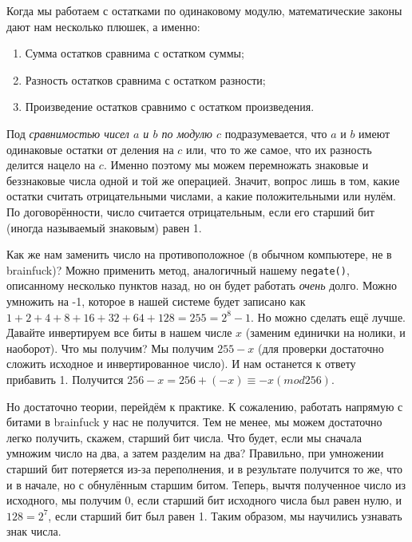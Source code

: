 \documentclass{book}
\begin{document}
Когда мы работаем с остатками по одинаковому модулю, математические законы дают нам несколько плюшек, а именно:

\begin{enumerate}
    \item Сумма остатков сравнима с остатком суммы;
    \item Разность остатков сравнима с остатком разности;
    \item Произведение остатков сравнимо с остатком произведения.
\end{enumerate}

Под {\em сравнимостью чисел $a$ и $b$ по модулю $c$} подразумевается, что $a$ и $b$ имеют одинаковые остатки от деления
на $c$ или, что то же самое, что их разность делится нацело на $c$. Именно поэтому мы можем перемножать знаковые и
беззнаковые числа одной и той же операцией. Значит, вопрос лишь в том, какие остатки считать отрицательными числами,
а какие положительными или нулём. По договорённости, число считается отрицательным, если его старший бит (иногда
называемый знаковым) равен 1.

Как же нам заменить число на противоположное (в обычном компьютере, не в brainfuck)? Можно применить метод, аналогичный
нашему \texttt{negate()}, описанному несколько пунктов назад, но он будет работать {\em очень} долго. Можно умножить на -1,
которое в нашей системе будет записано как $1 + 2 + 4 + 8 + 16 + 32 + 64 + 128 = 255 = 2^8 - 1$. Но можно сделать ещё
лучше. Давайте инвертируем все биты в нашем числе $x$ (заменим единички на нолики, и наоборот). Что мы получим? Мы
получим $255 - x$ (для проверки достаточно сложить исходное и инвертированное число). И нам останется к ответу прибавить 1.
Получится $256 - x = 256 + (-x) \equiv -x (mod 256)$. 

Но достаточно теории, перейдём к практике. К сожалению, работать напрямую с битами в brainfuck у нас не получится.
Тем не менее, мы можем достаточно легко получить, скажем, старший бит числа. Что будет, если мы сначала умножим число на два,
а затем разделим на два? Правильно, при умножении старший бит потеряется из-за переполнения, и в результате получится
то же, что и в начале, но с обнулённым старшим битом. Теперь, вычтя полученное число из исходного, мы получим 0, если
старший бит исходного числа был равен нулю, и $128 = 2^7$, если старший бит был равен 1. Таким образом, мы научились узнавать
знак числа.
\end{document}

